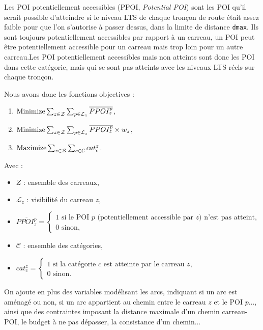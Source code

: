 Les POI potentiellement accessibles (PPOI, \emph{Potential POI}) sont les POI qu'il serait possible d'atteindre si le niveau LTS de chaque tronçon de route était assez faible pour que l'on s'autorise à passer dessus, dans la limite de distance \texttt{dmax}. Ils sont toujours potentiellement accessibles par rapport à un carreau, un POI peut être potentiellement accessible pour un carreau mais trop loin pour un autre carreau.Les POI potentiellement accessibles mais non atteints sont donc les POI dans cette catégorie, mais qui se sont pas atteints avec les niveaux LTS réels sur chaque tronçon. 

Nous avons donc les fonctions objectives :

\begin{enumerate} \label{enum:function_obj}
    \item $\operatorname{Minimize} \sum_{z \in \mathcal{Z} } \sum_{p \in \mathcal{L}_z} \overline{PPOI_z^p}$,
    \item $\operatorname{Minimize} \sum_{z \in \mathcal{Z} } \sum_{p \in \mathcal{L}_z} \overline{PPOI_z^p} \times w_z$,
    \item $\operatorname{Maximize} \sum_{z \in \mathcal{Z} } \sum_{c \in \mathcal{C}} cat_c^z$.
\end{enumerate}

Avec :

\begin{itemize}
    \item $Z$ : ensemble des carreaux,
    \item $\mathcal{L}_z$ : visibilité du carreau $z$,
    \item $\overline{PPOI_z^p}=
    \begin{cases}
        1 \text{ si le POI $p$ (potentiellement accessible par $z$) n'est pas atteint,} \\
        0 \text{ sinon,}
    \end{cases}$
    \item $\mathcal{C}$ : ensemble des catégories,
    \item $cat_c^z=
    \begin{cases}
        1 \text{ si la catégorie $c$ est atteinte par le carreau $z$,} \\
        0 \text{ sinon.}
    \end{cases}$
\end{itemize}

On ajoute en plus des variables modélisant les arcs, indiquant si un arc est aménagé ou non, si un arc appartient au chemin entre le carreau $z$ et le POI $p$..., ainsi que des contraintes imposant la distance maximale d'un chemin carreau-POI, le budget à ne pas dépasser, la consistance d'un chemin...

